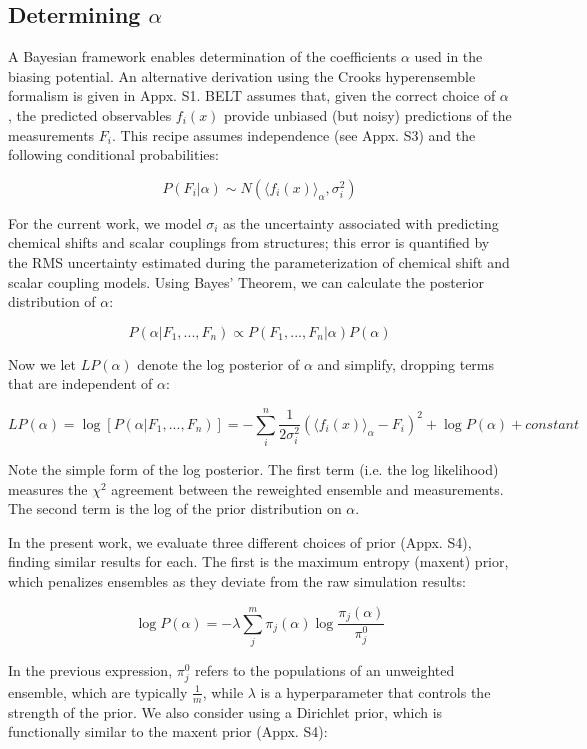 \documentclass[journal=jacsat,manuscript=article]{achemso}
\begin{document}
\subsection*{Determining $\alpha$}

A Bayesian framework enables determination of the coefficients $\alpha$ used in the biasing potential.  An alternative derivation using the Crooks hyperensemble formalism \cite{crooks2007beyond} is given in Appx. S1.  BELT assumes that, given the correct choice of $\alpha$, the predicted observables $f_i(x)$ provide unbiased (but noisy) predictions of the measurements $F_i$.  This recipe assumes independence (see Appx. S3) and the following conditional probabilities:

$$P(F_i | \alpha) \sim N(\langle f_i(x)\rangle _\alpha, \sigma_i^2)$$

For the current work, we model $\sigma_i$ as the uncertainty associated with predicting chemical shifts and scalar couplings from structures; this error is quantified by the RMS uncertainty estimated during the parameterization of chemical shift and scalar coupling models.  Using Bayes' Theorem, we can calculate the posterior distribution of $\alpha$:

$$P(\alpha | F_1, ..., F_n) \propto P(F_1, ..., F_n | \alpha) P(\alpha)$$

Now we let $LP(\alpha)$ denote the log posterior of $\alpha$ and simplify, dropping terms that are independent of $\alpha$:

$$LP(\alpha) = \log[ P(\alpha|F_1, ..., F_n)] = -\sum_i^n \frac{1}{2\sigma_i^2}(\langle f_i(x)\rangle _\alpha - F_i)^2 + \log P(\alpha) + constant$$

Note the simple form of the log posterior.  The first term (i.e. the log likelihood) measures the $\chi^2$ agreement between the reweighted ensemble and measurements.  The second term is the log of the prior distribution on $\alpha$.  

In the present work, we evaluate three different choices of prior (Appx. S4), finding similar results for each.  The first is the maximum entropy (maxent) prior, which penalizes ensembles as they deviate from the raw simulation results:

$$\log P(\alpha) = -\lambda \sum_j^m \pi_j(\alpha) \log \frac{\pi_j(\alpha)}{\pi_j^0}$$

In the previous expression, $\pi_j^0$ refers to the populations of an unweighted ensemble, which are typically $\frac{1}{m}$, while $\lambda$ is a hyperparameter that controls the strength of the prior.  We also consider using a Dirichlet prior, which is functionally similar to the maxent prior (Appx. S4):
\end{document}

